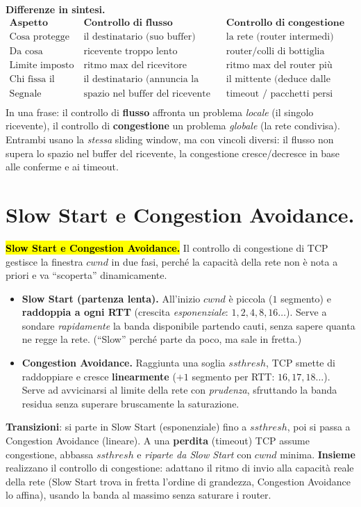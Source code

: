 \documentclass[11pt,a4paper]{report}
\begin{document}
\textbf{Differenze in sintesi.}
\[
\begin{array}{l|l|l}
\textbf{Aspetto} & \textbf{Controllo di flusso} & \textbf{Controllo di congestione} \\ \hline
\text{Cosa protegge} & \text{il destinatario (suo buffer)} & \text{la rete (router intermedi)} \\
\text{Da cosa} & \text{ricevente troppo lento} & \text{router/colli di bottiglia} \\
\text{Limite imposto} & \text{ritmo max del ricevitore} & \text{ritmo max del router più lento} \\
\text{Chi fissa il limite} & \text{il destinatario (annuncia la finestra)} & \text{il mittente (deduce dalle perdite)} \\
\text{Segnale} & \text{spazio nel buffer del ricevente} & \text{timeout / pacchetti persi} \\
\end{array}
\]
In una frase: il controllo di \textbf{flusso} affronta un problema \emph{locale} (il singolo ricevente), il controllo di \textbf{congestione} un problema \emph{globale} (la rete condivisa). Entrambi usano la \emph{stessa} sliding window, ma con vincoli diversi: il flusso non supera lo spazio nel buffer del ricevente, la congestione cresce/decresce in base alle conferme e ai timeout.
\section{Slow Start e Congestion Avoidance.}
\hl{\textbf{Slow Start e Congestion Avoidance.}} Il controllo di congestione di TCP
gestisce la finestra $cwnd$ in due fasi, perché la capacità della rete non è nota
a priori e va ``scoperta'' dinamicamente.
\begin{itemize}[noitemsep]
\item \textbf{Slow Start (partenza lenta).} All'inizio $cwnd$ è piccola ($1$
segmento) e \textbf{raddoppia a ogni RTT} (crescita \emph{esponenziale}:
$1,2,4,8,16\dots$). Serve a sondare \emph{rapidamente} la banda disponibile
partendo cauti, senza sapere quanta ne regge la rete. (``Slow'' perché parte da
poco, ma sale in fretta.)
\item \textbf{Congestion Avoidance.} Raggiunta una soglia $ssthresh$, TCP smette
di raddoppiare e cresce \textbf{linearmente} ($+1$ segmento per RTT:
$16,17,18\dots$). Serve ad avvicinarsi al limite della rete con \emph{prudenza},
sfruttando la banda residua senza superare bruscamente la saturazione.
\end{itemize}
\textbf{Transizioni}: si parte in Slow Start (esponenziale) fino a $ssthresh$, poi
si passa a Congestion Avoidance (lineare). A una \textbf{perdita} (timeout) TCP
assume congestione, abbassa $ssthresh$ e \emph{riparte da Slow Start} con $cwnd$
minima. \textbf{Insieme} realizzano il controllo di congestione: adattano il ritmo
di invio alla capacità reale della rete (Slow Start trova in fretta l'ordine di
grandezza, Congestion Avoidance lo affina), usando la banda al massimo senza
saturare i router.
\end{document}
